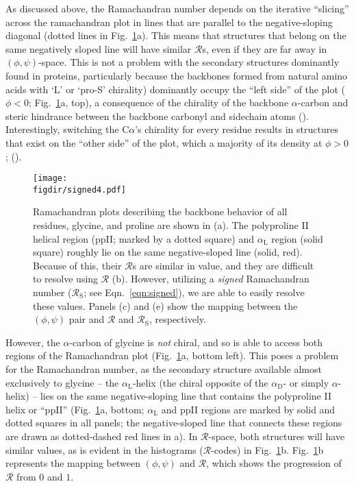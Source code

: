 \documentclass[fleqn,10pt]{wlpeerj} %
\newcommand{\Fig}[1]{Fig.~\ref{#1}}
\newcommand{\Eqn}[1]{Eqn.~\ref{#1}}
\newcommand{\rr}{$\mathcal{R}$\xspace}
\newcommand{\figdir}{./figures}
\begin{document}
As discussed above, the Ramachandran number depends on the iterative ``slicing'' across the ramachandran plot in lines that are parallel to the negative-sloping diagonal (dotted lines in \Fig{fig_altr}a). This means that structures that belong on the same negatively sloped line will have similar $\mathcal{R}$s, even if they are far away in $(\phi,\psi)$-space. This is not a problem with the secondary structures dominantly found in proteins, particularly because the backbones formed from natural amino acids with `L' or `pro-S' chirality)  dominantly occupy the ``left side'' of the plot ($\phi<0$; \Fig{fig_altr}a, top), a consequence of the chirality of the backbone $\alpha$-carbon \citep{Berg2006,Cintas2002} and steric hindrance between the backbone carbonyl and sidechain atoms (\cite{Branden1999}). Interestingly, switching the C$\alpha$'s chirality for every residue results in structures that exist on the ``other side'' of the plot, which a majority of its density at $\phi>0$; (\cite{Zacharias2013,Ho2003,Mannige2017a}). 

\begin{figure}[b!]
\texttt{[image: \\figdir/signed4.pdf]}
\caption{Ramachandran plots describing the backbone behavior of all residues, glycine, and proline are shown in (a). The polyproline II helical region (ppII; marked by a dotted square) and $\alpha_\textrm{L}$ region (solid square) roughly lie on the same negative-sloped line (solid, red). Because of this, their $\mathcal{R}$s are similar in value, and they are difficult to resolve using $\mathcal{R}$ (b). However, utilizing a {\it signed } Ramachandran number ($\mathcal{R}_\textrm{S}$; see \Eqn{eqn:signed}), we are able to easily resolve these values. Panels (c) and (e) show the mapping between the $(\phi,\psi)$ pair and $\mathcal{R}$ and $\mathcal{R}_\textrm{S}$, respectively. \label{fig_altr}}
\end{figure}

However, the $\alpha$-carbon of glycine is {\it not} chiral, and so is able to access both regions of the Ramachandran plot (\Fig{fig_altr}a, bottom left). This poses a problem for the Ramachandran number, as the secondary structure available almost exclusively to glycine -- the $\alpha_\textrm{L}$-helix (the chiral opposite of the $\alpha_\textrm{D}$- or simply $\alpha$-helix) -- lies on the same negative-sloping line that contains the polyproline II helix \citep{Chebrek2014} or ``ppII'' (\Fig{fig_altr}a, bottom; $\alpha_\textrm{L}$ and ppII regions are marked by solid and dotted squares in all panels; the negative-sloped line that connects these regions are drawn as dotted-dashed red lines in a). In \rr-space, both structures will have similar values, as is evident in the histograms (\rr-codes) in \Fig{fig_altr}b. \Fig{fig_altr}b represents the mapping between $(\phi,\psi)$ and $\mathcal{R}$, which shows the progression of $\mathcal{R}$ from $0$ and $1$.
\end{document}

